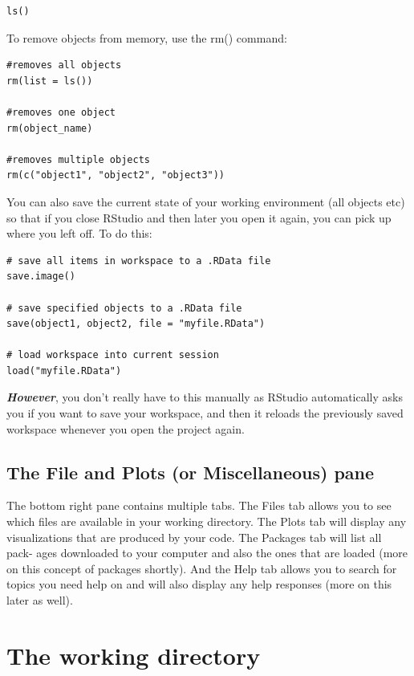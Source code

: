 \documentclass[]{book}
\begin{document}
\begin{verbatim}
ls()
\end{verbatim}

To remove objects from memory, use the rm() command:

\begin{verbatim}
#removes all objects
rm(list = ls())

#removes one object
rm(object_name)

#removes multiple objects
rm(c("object1", "object2", "object3"))
\end{verbatim}

You can also save the current state of your working environment (all objects etc) so that if you close RStudio and then later you open it again, you can pick up where you left off. To do this:

\begin{verbatim}
# save all items in workspace to a .RData file 
save.image()

# save specified objects to a .RData file 
save(object1, object2, file = "myfile.RData") 

# load workspace into current session
load("myfile.RData")
\end{verbatim}

\textbf{\emph{However}}, you don't really have to this manually as RStudio automatically asks you if you want to save your workspace, and then it reloads the previously saved workspace whenever you open the project again.

\hypertarget{the-file-and-plots-or-miscellaneous-pane}{%
\subsection{The File and Plots (or Miscellaneous) pane}\label{the-file-and-plots-or-miscellaneous-pane}}

The bottom right pane contains multiple tabs. The Files tab allows you to see which files are available in your working directory. The Plots tab will display any visualizations that are produced by your code. The Packages tab will list all pack- ages downloaded to your computer and also the ones that are loaded (more on this concept of packages shortly). And the Help tab allows you to search for topics you need help on and will also display any help responses (more on this later as well).

\hypertarget{the-working-directory}{%
\section{The working directory}\label{the-working-directory}}
\end{document}
